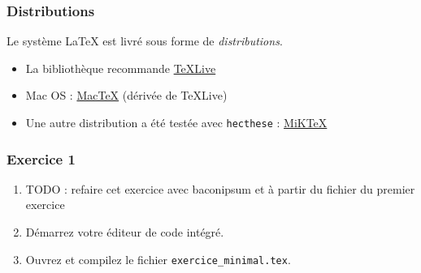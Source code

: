 
\begin{frame}[c]

	\frametitle{Distributions}
	
	Le système {\LaTeX} est livré sous forme de \emph{distributions}.
	
	\begin{itemize}
		\item La bibliothèque recommande \href{https://www.tug.org/texlive}{\TeX Live}
		\item Mac OS : \href{https://www.tug.org/mactex}{Mac\TeX} (dérivée de \TeX Live)
		\item Une autre distribution a été testée avec \texttt{hecthese} :
			\href{https://miktex.org/download}{MiK\TeX}
	\end{itemize}
\end{frame}


\begin{frame}[c]

\frametitle{Exercice 1}

\begin{enumerate}
	\item TODO : refaire cet exercice avec baconipsum et à partir du fichier du premier exercice
	\item Démarrez votre éditeur de code intégré.
	\item Ouvrez et compilez le fichier \texttt{exercice\_minimal.tex}.
\end{enumerate}

\end{frame}